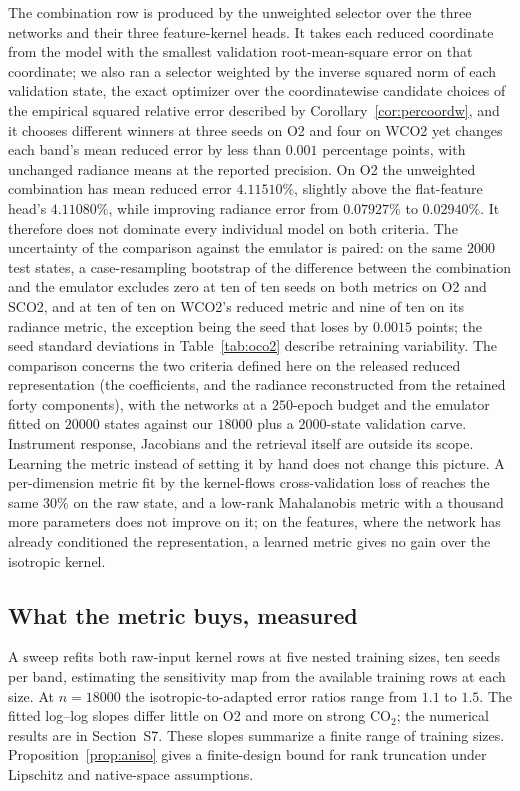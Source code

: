 The combination row is produced by the unweighted selector over the three networks and
their three feature-kernel heads. It takes each reduced
coordinate from the model with the smallest validation root-mean-square
error on that coordinate; we also ran a selector
weighted by the inverse squared norm of each validation state, the exact
optimizer over the coordinatewise candidate choices of the empirical
squared relative error described by Corollary~\ref{cor:percoordw}, and
it chooses different winners at three seeds on O2 and four on WCO2 yet
changes each band's mean reduced error by less than $0.001$ percentage
points, with unchanged radiance means at the reported precision. On O2 the unweighted combination has mean
reduced error $4.11510\%$, slightly above the flat-feature head's
$4.11080\%$, while improving radiance error from $0.07927\%$ to
$0.02940\%$. It therefore does not dominate every individual model on both
criteria. The uncertainty of the
comparison against the emulator is paired: on the same $2000$ test states,
a case-resampling bootstrap of the difference between the combination and
the emulator excludes zero at ten of ten seeds on both metrics on O2 and
SCO2, and at ten of ten on WCO2's reduced metric and nine of ten on its
radiance metric, the exception being the seed that loses by $0.0015$ points;
the seed standard deviations in Table~\ref{tab:oco2} describe retraining variability. The comparison concerns the two criteria defined here on the released
reduced representation (the coefficients, and the radiance reconstructed from the retained forty components), with the networks at a $250$-epoch
budget and the emulator fitted on $20000$ states against our $18000$ plus a
$2000$-state validation carve. Instrument response, Jacobians and the
retrieval itself are outside its scope. Learning the metric instead of setting it by hand does not change this picture. A per-dimension metric fit by
the kernel-flows cross-validation loss of \citet{owhadi2019kernel} reaches the
same $30\%$ on the raw state, and a low-rank Mahalanobis metric with a thousand
more parameters does not improve on it; on the features, where the network has
already conditioned the representation, a learned metric gives no gain over the
isotropic kernel.

\subsection{What the metric buys, measured}
\label{sec:aniso-measured}
A sweep refits both raw-input kernel rows at five nested
training sizes, ten seeds per band, estimating the sensitivity map from
the available training rows at each size. At $n=18000$ the isotropic-to-adapted
error ratios range from $1.1$ to $1.5$. The fitted log--log slopes differ
little on O2 and more on strong CO$_2$; the numerical results are in
Section~S7. These slopes summarize a finite range of training sizes.
Proposition~\ref{prop:aniso} gives a finite-design bound for rank
truncation under Lipschitz and native-space assumptions.
